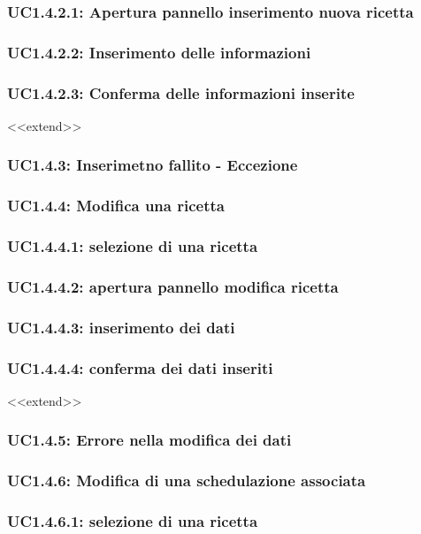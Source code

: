 \subsubsection{UC1.4.2.1: Apertura pannello inserimento nuova ricetta}
\subsubsection{UC1.4.2.2: Inserimento delle informazioni }
\subsubsection{UC1.4.2.3: Conferma delle informazioni inserite}
<<extend>>
\subsubsection{UC1.4.3: Inserimetno fallito - Eccezione}
\subsubsection{UC1.4.4: Modifica una ricetta}
\subsubsection{UC1.4.4.1: selezione di una ricetta}
\subsubsection{UC1.4.4.2: apertura pannello modifica ricetta}
\subsubsection{UC1.4.4.3: inserimento dei dati}
\subsubsection{UC1.4.4.4: conferma dei dati inseriti}
<<extend>>
\subsubsection{UC1.4.5: Errore nella modifica dei dati}
\subsubsection{UC1.4.6: Modifica di una schedulazione associata}
\subsubsection{UC1.4.6.1: selezione di una ricetta}
